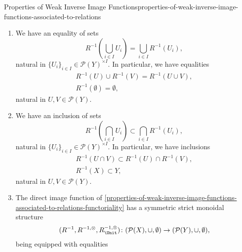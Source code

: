 \begin{proposition}{Properties of Weak Inverse Image Functions}{properties-of-weak-inverse-image-functions-associated-to-relations}
\begin{enumerate}
\begin{itemize}
\begin{itemize}
                    \end{itemize}
            \end{itemize}
        \item\label{properties-of-weak-inverse-image-functions-associated-to-relations-preservation-of-colimits}We have an equality of sets
            \[
                R^{-1}(\bigcup_{i\in I}U_{i})%
                =%
                \bigcup_{i\in I}R^{-1}(U_{i}),%
            \]%
            natural in $\{U_{i}\}_{i\in I}\in\mathcal{P}(Y)^{\times I}$. In particular, we have equalities%
            \[
                \begin{gathered}
                    R^{-1}(U)\cup R^{-1}(V) = R^{-1}(U\cup V),\\
                    R^{-1}(\emptyset)       = \emptyset,
                \end{gathered}
            \]%
            natural in $U,V\in\mathcal{P}(Y)$.
        \item\label{properties-of-weak-inverse-image-functions-associated-to-relations-oplax-preservation-of-limits}We have an inclusion of sets
            \[
                R^{-1}(\bigcap_{i\in I}U_{i})%
                \subset%
                \bigcap_{i\in I}R^{-1}(U_{i}),%
            \]%
            natural in $\{U_{i}\}_{i\in I}\in\mathcal{P}(Y)^{\times I}$. In particular, we have inclusions%
            \[
                \begin{gathered}
                    R^{-1}(U\cap V) \subset R^{-1}(U)\cap R^{-1}(V),\\
                    R^{-1}(X)       \subset Y,
                \end{gathered}
            \]%
            natural in $U,V\in\mathcal{P}(Y)$.
        \item\label{properties-of-weak-inverse-image-functions-associated-to-relations-symmetric-strict-monoidality-with-respect-to-unions}The direct image function of \cref{properties-of-weak-inverse-image-functions-associated-to-relations-functoriality} has a symmetric strict monoidal structure
            \[
                (R^{-1},R^{-1,\otimes},R^{-1,\otimes}_{\Unit})
                \colon
                (\mathcal{P}(X),\cup,\emptyset)
                \to
                (\mathcal{P}(Y),\cup,\emptyset),
            \]%
            being equipped with equalities%
            \[
                \begin{gathered}

\end{gathered}\]
\end{enumerate}
\end{proposition}

